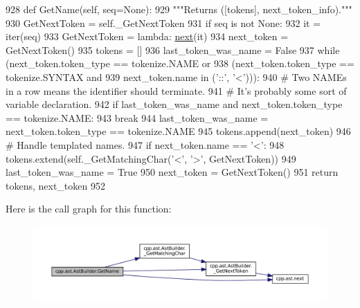 \begin{DoxyCode}
928     \textcolor{keyword}{def }GetName(self, seq=None):
929         \textcolor{stringliteral}{"""Returns ([tokens], next\_token\_info)."""}
930         GetNextToken = self.\_GetNextToken
931         \textcolor{keywordflow}{if} seq \textcolor{keywordflow}{is} \textcolor{keywordflow}{not} \textcolor{keywordtype}{None}:
932             it = iter(seq)
933             GetNextToken = \textcolor{keyword}{lambda}: \hyperlink{namespacecpp_1_1ast_a39ad8261fef5e0a7c1c17c510541b66f}{next}(it)
934         next\_token = GetNextToken()
935         tokens = []
936         last\_token\_was\_name = \textcolor{keyword}{False}
937         \textcolor{keywordflow}{while} (next\_token.token\_type == tokenize.NAME \textcolor{keywordflow}{or}
938                (next\_token.token\_type == tokenize.SYNTAX \textcolor{keywordflow}{and}
939                 next\_token.name \textcolor{keywordflow}{in} (\textcolor{stringliteral}{'::'}, \textcolor{stringliteral}{'<'}))):
940             \textcolor{comment}{# Two NAMEs in a row means the identifier should terminate.}
941             \textcolor{comment}{# It's probably some sort of variable declaration.}
942             \textcolor{keywordflow}{if} last\_token\_was\_name \textcolor{keywordflow}{and} next\_token.token\_type == tokenize.NAME:
943                 \textcolor{keywordflow}{break}
944             last\_token\_was\_name = next\_token.token\_type == tokenize.NAME
945             tokens.append(next\_token)
946             \textcolor{comment}{# Handle templated names.}
947             \textcolor{keywordflow}{if} next\_token.name == \textcolor{stringliteral}{'<'}:
948                 tokens.extend(self.\_GetMatchingChar(\textcolor{stringliteral}{'<'}, \textcolor{stringliteral}{'>'}, GetNextToken))
949                 last\_token\_was\_name = \textcolor{keyword}{True}
950             next\_token = GetNextToken()
951         \textcolor{keywordflow}{return} tokens, next\_token
952 
\end{DoxyCode}
Here is the call graph for this function\+:
\nopagebreak
\begin{figure}[H]
\begin{center}
\leavevmode
\includegraphics[width=350pt]{classcpp_1_1ast_1_1AstBuilder_a327957c4228325fc5f64821b047bdc6f_cgraph}
\end{center}
\end{figure}
